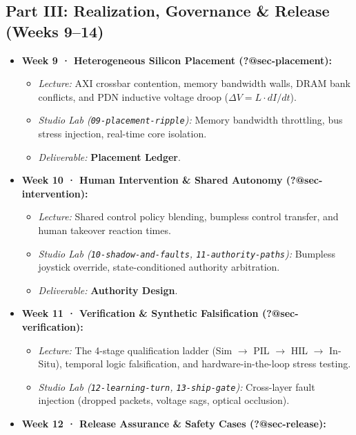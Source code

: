 \documentclass[
  9pt,
  letterpaper,
  open=right,
  numbers=noenddot,
  captions=tableheading]{scrbook}
\makeatletter
\providecommand{\tightlist}{%
  \setlength{\itemsep}{0pt}\setlength{\parskip}{0pt}}
\def\tightlist{}
\let\tightlist\relax
\newif\ifmlsys@inside@longtable
\newif\ifmlsys@longtable@numbered
\let\mlsys@orig@label\label
\renewcommand{\label}[1]{%
  \ifmlsys@inside@longtable
    \global\mlsys@longtable@numberedtrue
  \fi
  \mlsys@orig@label{#1}%
}
\let\label\mlsys@orig@label
\makeatother
\begin{document}
\subsection*{Part III: Realization, Governance \& Release (Weeks
9--14)}\label{part-iii-realization-governance-release-weeks-914}

\begin{itemize}
\tightlist
\item
  \textbf{Week 9 · Heterogeneous Silicon Placement
  (\textbf{?@sec-placement}):}

  \begin{itemize}
  \tightlist
  \item
    \emph{Lecture:} AXI crossbar contention, memory bandwidth walls,
    DRAM bank conflicts, and PDN inductive voltage droop
    (\(\Delta V = L \cdot dI/dt\)).
  \item
    \emph{Studio Lab (\texttt{09-placement-ripple}):} Memory bandwidth
    throttling, bus stress injection, real-time core isolation.
  \item
    \emph{Deliverable:} \textbf{Placement Ledger}.
  \end{itemize}
\item
  \textbf{Week 10 · Human Intervention \& Shared Autonomy
  (\textbf{?@sec-intervention}):}

  \begin{itemize}
  \tightlist
  \item
    \emph{Lecture:} Shared control policy blending, bumpless control
    transfer, and human takeover reaction times.
  \item
    \emph{Studio Lab (\texttt{10-shadow-and-faults},
    \texttt{11-authority-paths}):} Bumpless joystick override,
    state-conditioned authority arbitration.
  \item
    \emph{Deliverable:} \textbf{Authority Design}.
  \end{itemize}
\item
  \textbf{Week 11 · Verification \& Synthetic Falsification
  (\textbf{?@sec-verification}):}

  \begin{itemize}
  \tightlist
  \item
    \emph{Lecture:} The 4-stage qualification ladder (Sim \(\to\) PIL
    \(\to\) HIL \(\to\) In-Situ), temporal logic falsification, and
    hardware-in-the-loop stress testing.
  \item
    \emph{Studio Lab (\texttt{12-learning-turn},
    \texttt{13-ship-gate}):} Cross-layer fault injection (dropped
    packets, voltage sags, optical occlusion).
  \end{itemize}
\item
  \textbf{Week 12 · Release Assurance \& Safety Cases
  (\textbf{?@sec-release}):}


\end{itemize}
\end{document}
